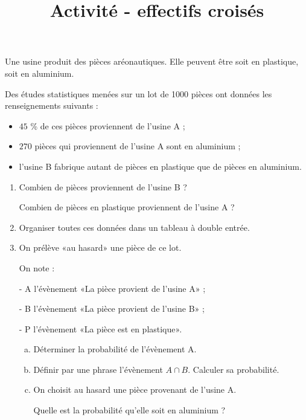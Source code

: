 \documentclass[table]{beamer}
\title{Activité - effectifs croisés}
\begin{document}
\footnotesize

\begin{frame}
	Une usine produit des pièces aréonautiques. Elle peuvent être soit en plastique, soit en aluminium.

	Des études statistiques menées sur un lot de 1000 pièces ont données les renseignements suivants :
	\begin{itemize}
		\item $45$ \% de ces pièces proviennent de l'usine A ;
		\item $270$ pièces qui proviennent de l'usine A sont en aluminium ;
		\item l'usine B fabrique autant de pièces en plastique que de pièces en aluminium.
	\end{itemize}

	\begin{enumerate}
		\item Combien de pièces proviennent de l'usine B ? %

		      Combien de pièces en plastique proviennent de l'usine A ? %
		\item Organiser toutes ces données dans un tableau à double entrée.
		\item On prélève «au hasard» une pièce de ce lot.

		      On note :

		      - A l'évènement «La pièce provient de l'usine A» ;

		      - B l'évènement «La pièce provient de l'usine B» ;

		      - P l'évènement «La pièce est en plastique».
		      \begin{enumerate}[a.]
			      \item Déterminer la probabilité de l'évènement A.
			      \item Définir par une phrase l'évènement $A ∩ B$. Calculer sa probabilité.
			      \item On choisit au hasard une pièce provenant de l'usine A.

			            Quelle est la probabilité qu'elle soit en aluminium ?
		      \end{enumerate}
	\end{enumerate}
\end{frame}
\end{document}
